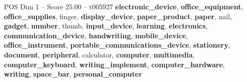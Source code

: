 \begin{textsample}{POS Dim 1 – Score 25.00 – t005927}  \label{ex:f1_pos_026}
\textbf{electronic\_device}, \textbf{office\_equipment}, \textbf{office\_supplies}, finger, \textbf{display\_device}, \textbf{paper\_product}, \textbf{paper}, nail, \textbf{gadget}, \textbf{number}, thumb, \textbf{input\_device}, \textbf{learning}, \textbf{electronics}, \textbf{communication\_device}, \textbf{handwriting}, \textbf{mobile\_device}, \textbf{office\_instrument}, \textbf{portable\_communications\_device}, \textbf{stationery}, \textbf{document}, \textbf{peripheral}, calculator, \textbf{computer}, \textbf{multimedia}, \textbf{computer\_keyboard}, \textbf{writing\_implement}, \textbf{computer\_hardware}, \textbf{writing}, \textbf{space\_bar}, \textbf{personal\_computer}

\end{textsample}

